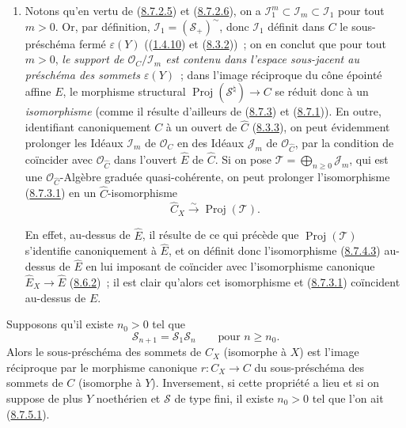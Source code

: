 \begin{remark}[8.7.4]
\begin{enumerate}
  \item[\rm{(ii)}] Notons qu'en vertu de
  (\hyperref[II.8.7.2.5-fr]{8.7.2.5}) et
  (\hyperref[II.8.7.2.6-fr]{8.7.2.6}), on a
  $\mathcal{I}_1^m\subset\mathcal{I}_m\subset\mathcal{I}_1$ pour tout $m>0$.
  Or, par définition, $\mathcal{I}_1=(\mathcal{S}_+)^{\sim}$, donc
  $\mathcal{I}_1$ définit dans $C$ le sous-préschéma fermé
  $\varepsilon(Y)$ ((\hyperref[II.1.4.10-fr]{1.4.10}) et
  (\hyperref[II.8.3.2-fr]{8.3.2}))~; on en conclut que pour tout $m>0$,
  \emph{le support de $\mathcal{O}_C/\mathcal{I}_m$ est contenu dans l'espace
  sous-jacent au préschéma des sommets $\varepsilon(Y)$}~; dans l'image
  réciproque du cône épointé affine $E$, le morphisme structural
  $\operatorname{Proj}(\mathcal{S}^{\natural})\to C$ se réduit donc à un
  \emph{isomorphisme} (comme il résulte d'ailleurs de
  (\hyperref[II.8.7.3-fr]{8.7.3}) et
  (\hyperref[II.8.7.1-fr]{8.7.1})). En outre, identifiant canoniquement $C$ à
  un ouvert de $\widehat{C}$ (\hyperref[II.8.3.3-fr]{8.3.3}), on peut
  évidemment prolonger les Idéaux $\mathcal{I}_m$ de $\mathcal{O}_C$ en des
  Idéaux $\mathcal{J}_m$ de $\mathcal{O}_{\widehat{C}}$, par la condition de
  coïncider avec $\mathcal{O}_{\widehat{C}}$ dans l'ouvert $\widehat{E}$ de
  $\widehat{C}$. Si on pose
  $\mathcal{T}=\bigoplus_{n\geqslant 0}\mathcal{J}_m$, qui est une
  $\mathcal{O}_{\widehat{C}}$-Algèbre graduée quasi-cohérente, on peut
  prolonger l'isomorphisme (\hyperref[II.8.7.3.1-fr]{8.7.3.1}) en un
  $\widehat{C}$-isomorphisme
  \begin{equation}
  \label{II.8.7.4.3-fr}
    \widehat{C}_X\xrightarrow{\sim}\operatorname{Proj}(\mathcal{T}).
  \tag{8.7.4.3}
  \end{equation}

  En effet, au-dessus de $\widehat{E}$, il résulte de ce qui précède que
  $\operatorname{Proj}(\mathcal{T})$ s'identifie canoniquement à
  $\widehat{E}$, et on définit donc l'isomorphisme
  (\hyperref[II.8.7.4.3-fr]{8.7.4.3}) au-dessus de $\widehat{E}$ en lui
  imposant de coïncider avec l'isomorphisme canonique
  $\widehat{E}_X\to\widehat{E}$ (\hyperref[II.8.6.2-fr]{8.6.2})~; il est clair
  qu'alors cet isomorphisme et (\hyperref[II.8.7.3.1-fr]{8.7.3.1}) coïncident
  au-dessus de $E$.
\end{enumerate}
\end{remark}

\begin{corollary}[8.7.5]
\label{II.8.7.5-fr}
Supposons qu'il existe $n_0>0$ tel que
\begin{equation}
\label{II.8.7.5.1-fr}
  \mathcal{S}_{n+1}=\mathcal{S}_1\mathcal{S}_n
  \qquad\text{pour }n\geqslant n_0.
\tag{8.7.5.1}
\end{equation}
Alors le sous-préschéma des sommets de $C_X$ (isomorphe à $X$) est l'image
réciproque par le morphisme canonique $r:C_X\to C$ du sous-préschéma des
sommets de $C$ (isomorphe à $Y$). Inversement, si cette propriété a lieu et
si on suppose de plus $Y$ noethérien et $\mathcal{S}$ de type fini, il existe
$n_0>0$ tel que l'on ait (\hyperref[II.8.7.5.1-fr]{8.7.5.1}).
\end{corollary}

